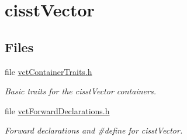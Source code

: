 \hypertarget{group__cisst_vector}{\section{cisst\-Vector}
\label{group__cisst_vector}
}
\subsection*{Files}
\begin{DoxyCompactItemize}
\item 
file \hyperlink{vct_container_traits_8h}{vct\-Container\-Traits.\-h}
\begin{DoxyCompactList}\small\item\em Basic traits for the cisst\-Vector containers. \end{DoxyCompactList}\item 
file \hyperlink{vct_forward_declarations_8h}{vct\-Forward\-Declarations.\-h}
\begin{DoxyCompactList}\small\item\em Forward declarations and \#define for cisst\-Vector. \end{DoxyCompactList}\end{DoxyCompactItemize}
